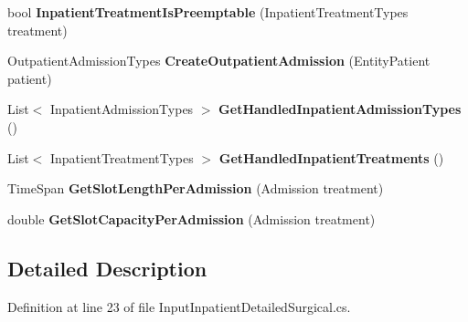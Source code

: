 \begin{DoxyCompactItemize}
\item 
bool {\bfseries Inpatient\+Treatment\+Is\+Preemptable} (Inpatient\+Treatment\+Types treatment)\hypertarget{class_general_health_elements_1_1_input_output_1_1_inpatient_1_1_input_inpatient_detailed_surgical_a931c4571f41e53fcb5f21c1b1ef258c0}{}\label{class_general_health_elements_1_1_input_output_1_1_inpatient_1_1_input_inpatient_detailed_surgical_a931c4571f41e53fcb5f21c1b1ef258c0}

\item 
Outpatient\+Admission\+Types {\bfseries Create\+Outpatient\+Admission} (Entity\+Patient patient)\hypertarget{class_general_health_elements_1_1_input_output_1_1_inpatient_1_1_input_inpatient_detailed_surgical_a8dcad73af98e483691767fd975815738}{}\label{class_general_health_elements_1_1_input_output_1_1_inpatient_1_1_input_inpatient_detailed_surgical_a8dcad73af98e483691767fd975815738}

\item 
List$<$ Inpatient\+Admission\+Types $>$ {\bfseries Get\+Handled\+Inpatient\+Admission\+Types} ()\hypertarget{class_general_health_elements_1_1_input_output_1_1_inpatient_1_1_input_inpatient_detailed_surgical_ad50031cee96f524280d3bb3515b44065}{}\label{class_general_health_elements_1_1_input_output_1_1_inpatient_1_1_input_inpatient_detailed_surgical_ad50031cee96f524280d3bb3515b44065}

\item 
List$<$ Inpatient\+Treatment\+Types $>$ {\bfseries Get\+Handled\+Inpatient\+Treatments} ()\hypertarget{class_general_health_elements_1_1_input_output_1_1_inpatient_1_1_input_inpatient_detailed_surgical_a0b07543e1d9bb8c41dc4daf3d82c1562}{}\label{class_general_health_elements_1_1_input_output_1_1_inpatient_1_1_input_inpatient_detailed_surgical_a0b07543e1d9bb8c41dc4daf3d82c1562}

\item 
Time\+Span {\bfseries Get\+Slot\+Length\+Per\+Admission} (Admission treatment)\hypertarget{class_general_health_elements_1_1_input_output_1_1_inpatient_1_1_input_inpatient_detailed_surgical_a18d3b42fbe6b4e5d962cab69cac3a3cc}{}\label{class_general_health_elements_1_1_input_output_1_1_inpatient_1_1_input_inpatient_detailed_surgical_a18d3b42fbe6b4e5d962cab69cac3a3cc}

\item 
double {\bfseries Get\+Slot\+Capacity\+Per\+Admission} (Admission treatment)\hypertarget{class_general_health_elements_1_1_input_output_1_1_inpatient_1_1_input_inpatient_detailed_surgical_a7e1cd9837e52ccf4b3fd1d09b4ee859b}{}\label{class_general_health_elements_1_1_input_output_1_1_inpatient_1_1_input_inpatient_detailed_surgical_a7e1cd9837e52ccf4b3fd1d09b4ee859b}

\end{DoxyCompactItemize}


\subsection{Detailed Description}


Definition at line 23 of file Input\+Inpatient\+Detailed\+Surgical.\+cs.

